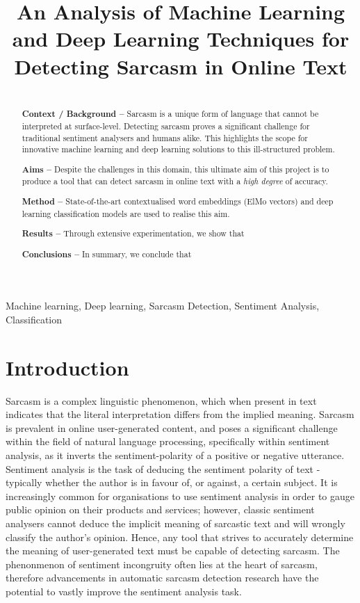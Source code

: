 \documentclass[12pt,a4paper]{article}
\title{An Analysis of Machine Learning and Deep Learning Techniques for Detecting Sarcasm in Online Text}
\author{} %
\date{}
\begin{document}
\maketitle

\begin{abstract}
\\ \indent \textbf{Context / Background --} 
Sarcasm is a unique form of language that cannot be interpreted at surface-level. Detecting sarcasm proves a significant challenge for traditional sentiment analysers and humans alike. This highlights the scope for innovative machine learning and deep learning solutions to this ill-structured problem.

\indent \textbf{Aims --} Despite the challenges in this domain, this ultimate aim of this project is to produce a tool that can detect sarcasm in online text with a \textit{high degree} of accuracy. 

\indent \textbf{Method --} State-of-the-art contextualised word embeddings (ElMo vectors) and deep learning classification models are used to realise this aim.

\indent \textbf{Results --} Through extensive experimentation, we show that

\indent \textbf{Conclusions --} In summary, we conclude that

\end{abstract}

\begin{keywords}
Machine learning, Deep learning, Sarcasm Detection, Sentiment Analysis, Classification
\end{keywords}


\section{Introduction}
\noindent Sarcasm is a complex linguistic phenomenon, which when present in text indicates that the literal interpretation differs from the implied meaning. Sarcasm is prevalent in online user-generated content, and poses a significant challenge within the field of natural language processing, specifically within sentiment analysis, as it inverts the sentiment-polarity of a positive or negative utterance. Sentiment analysis is the task of deducing the sentiment polarity of text - typically whether the author is in favour of, or against, a certain subject. It is increasingly common for organisations to use sentiment analysis in order to gauge public opinion on their products and services; however, classic sentiment analysers cannot deduce the implicit meaning of sarcastic text and will wrongly classify the author's opinion. Hence, any tool that strives to accurately determine the meaning of user-generated text must be capable of detecting sarcasm. The phenonmenon of sentiment incongruity often lies at the heart of sarcasm, therefore advancements in automatic sarcasm detection research have the potential to vastly improve the sentiment analysis task.
\end{document}
